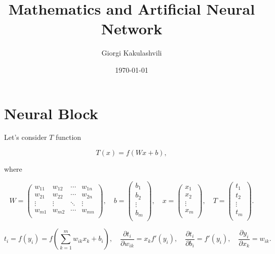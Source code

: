\documentclass{article}
\numberwithin{equation}{section}
\theoremstyle{definition}
\theoremstyle{remark}
\begin{document}
\title{Mathematics and Artificial Neural Network}
\author{Giorgi Kakulashvili}
\date{\today}
\maketitle
\thispagestyle{fancy}



\section{Neural Block}

Let's consider $T$ function

\begin{equation}\label{eq-basic-tr}
    T(x) = f\left( Wx + b \right),
\end{equation}

where

\[
    W = \begin{pmatrix}
        w_{11} & w_{12} & \cdots & w_{1n} \\
        w_{21} & w_{22} & \cdots & w_{2n} \\
        \vdots & \vdots & \ddots & \vdots \\
        w_{m1} & w_{m2} & \cdots & w_{mn} \\
    \end{pmatrix},
    \quad
    b = \begin{pmatrix}
        b_{1}  \\
        b_{2} \\
        \vdots \\
        b_{m} \\
    \end{pmatrix},
    \quad
    x = \begin{pmatrix}
        x_{1}  \\
        x_{2} \\
        \vdots \\
        x_{m} \\
    \end{pmatrix}, 
    \quad
    T = \begin{pmatrix}
        t_{1}  \\
        t_{2} \\
        \vdots \\
        t_{m} \\
    \end{pmatrix}.
\]

\[
    t_{i} = f(y_{i}) = f\left(\sum_{k=1}^{m} w_{ik} x_{k} + b_{i}\right), \quad
    \frac{\partial t_{i}}{\partial w_{ik}} = x_{k} f'(y_{i}), \quad
    \frac{\partial t_{i}}{\partial b_{i}} = f'(y_{i}), \quad
    \frac{\partial y_{i}}{\partial x_{k}} = w_{ik}.
\]
\end{document}

